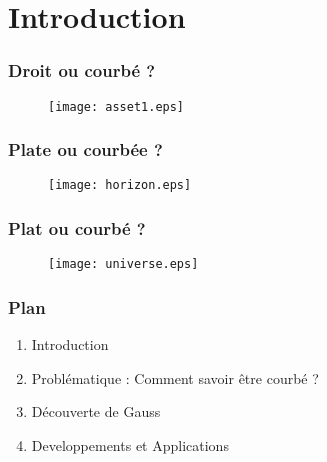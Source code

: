 \section{Introduction}
\begin{frame}
  \frametitle{Droit ou courbé ?}
  \begin{figure}
    \centering
    \texttt{[image: asset1.eps]}
  \end{figure}
\end{frame}

\begin{frame}
  \frametitle{Plate ou courbée ?}
  \begin{figure}
    \centering
    \texttt{[image: horizon.eps]}
  \end{figure}
\end{frame}

\begin{frame}
  \frametitle{Plat ou courbé ?}
  \begin{figure}
    \centering
    \texttt{[image: universe.eps]}
  \end{figure}
\end{frame}

\begin{frame}
  \frametitle{Plan}
  \begin{enumerate}
    \item Introduction
    \item Problématique : Comment savoir être courbé ?
    \item Découverte de Gauss 
    \item Developpements et Applications
  \end{enumerate}
\end{frame}
